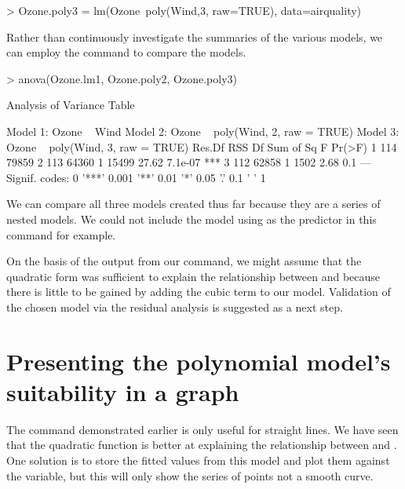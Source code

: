 \begin{Schunk}
\begin{Sinput}
> Ozone.poly3 = lm(Ozone~poly(Wind,3, raw=TRUE), data=airquality) 
\end{Sinput}
\end{Schunk}

Rather than continuously investigate the summaries of the various models, we can employ the  command to compare the models.  

\begin{Schunk}
\begin{Sinput}
> anova(Ozone.lm1, Ozone.poly2, Ozone.poly3) 
\end{Sinput}
\begin{Soutput}
Analysis of Variance Table

Model 1: Ozone ~ Wind
Model 2: Ozone ~ poly(Wind, 2, raw = TRUE)
Model 3: Ozone ~ poly(Wind, 3, raw = TRUE)
  Res.Df   RSS Df Sum of Sq     F  Pr(>F)    
1    114 79859                               
2    113 64360  1     15499 27.62 7.1e-07 ***
3    112 62858  1      1502  2.68     0.1    
---
Signif. codes:  
0 '***' 0.001 '**' 0.01 '*' 0.05 '.' 0.1 ' ' 1
\end{Soutput}
\end{Schunk}

We can compare all three models created thus far because they are a series of nested models. We could not include the model using  as the predictor in this command for example. 
 
On the basis of the output from our  command, we might assume that the quadratic form was sufficient to explain the relationship between  and  because there is little to be gained by adding the cubic term to our model. Validation of the chosen model via the residual analysis is suggested as a next step. 
 
\section{Presenting the polynomial model's suitability in a graph} 
 
The  command demonstrated earlier is only useful for straight lines. We have seen that the quadratic function is better at explaining the relationship between  and . One solution is to store the fitted values from this model and plot them against the  variable, but this will only show the series of points not a smooth curve.  

